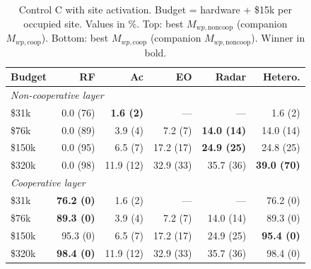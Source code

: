 \begin{table}[t]
\centering
\caption{Control C with site activation. Budget = hardware + \$15k per occupied site. Values in \%. Top: best $M_{wp,\mathrm{noncoop}}$ (companion $M_{wp,\mathrm{coop}}$). Bottom: best $M_{wp,\mathrm{coop}}$ (companion $M_{wp,\mathrm{noncoop}}$). Winner in bold.}
\label{tab:modality_ablation_dual_sites}
\setlength{\tabcolsep}{3pt}
\begin{tabular}{lrrrrr}
\toprule
Budget & RF & Ac & EO & Radar & Hetero. \\
\midrule
\multicolumn{6}{l}{\emph{Non-cooperative layer}} \\
\$31k & 0.0 (76) & \textbf{1.6 (2)} & --- & --- & 1.6 (2) \\
\$76k & 0.0 (89) & 3.9 (4) & 7.2 (7) & \textbf{14.0 (14)} & 14.0 (14) \\
\$150k & 0.0 (95) & 6.5 (7) & 17.2 (17) & \textbf{24.9 (25)} & 24.8 (25) \\
\$320k & 0.0 (98) & 11.9 (12) & 32.9 (33) & 35.7 (36) & \textbf{39.0 (70)} \\
\midrule
\multicolumn{6}{l}{\emph{Cooperative layer}} \\
\$31k & \textbf{76.2 (0)} & 1.6 (2) & --- & --- & 76.2 (0) \\
\$76k & \textbf{89.3 (0)} & 3.9 (4) & 7.2 (7) & 14.0 (14) & 89.3 (0) \\
\$150k & 95.3 (0) & 6.5 (7) & 17.2 (17) & 24.9 (25) & \textbf{95.4 (0)} \\
\$320k & \textbf{98.4 (0)} & 11.9 (12) & 32.9 (33) & 35.7 (36) & 98.4 (0) \\
\bottomrule
\end{tabular}
\end{table}
